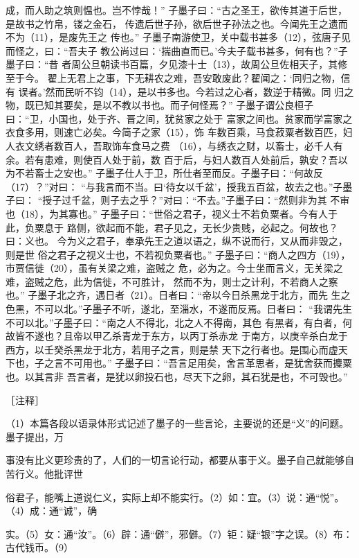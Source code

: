 \documentclass[12pt,UTF8]{ctexbook}
\begin{document}
成，而人助之筑则愠也。岂不悖哉！” 
子墨子曰：“古之圣王，欲传其道于后世，是故书之竹帛，镂之金石， 
传遗后世子孙，欲后世子孙法之也。今闻先王之遗而不为（11），是废先王之 
传也。” 
子墨子南游使卫，关中载书甚多（12），弦唐子见而怪之，曰：“吾夫子 
教公尚过曰：‘揣曲直而已。’今夫子载书甚多，何有也？”子墨子曰：“昔 
者周公旦朝读书百篇，夕见漆十士（13），故周公旦佐相天子，其修至于今。 
翟上无君上之事，下无耕农之难，吾安敢废此？翟闻之：‘同归之物，信有 
误者。’然而民听不钧（14），是以书多也。今若过之心者，数逆于精微。同 
归之物，既已知其要矣，是以不教以书也。而子何怪焉？” 
子墨子谓公良桓子曰：“卫，小国也，处于齐、晋之间，犹贫家之处于 
富家之间也。贫家而学富家之衣食多用，则速亡必矣。今简子之家（15），饰 
车数百乘，马食菽粟者数百匹，妇人衣文绣者数百人，吾取饰车食马之费 
（16），与绣衣之财，以畜士，必千人有余。若有患难，则使百人处于前，数 
百于后，与妇人数百人处前后，孰安？吾以为不若畜士之安也。” 
子墨子仕人于卫，所仕者至而反。子墨子曰：“何故反（17）？”对曰： 
“与我言而不当。曰‘待女以千盆’，授我五百盆，故去之也。”子墨子曰： 
“授子过千盆，则子去之乎？”对曰：“不去。”子墨子曰：“然则非为其 
不审也（18），为其寡也。” 
子墨子曰：“世俗之君子，视义士不若负粟者。今有人于此，负粟息于 
路侧，欲起而不能，君子见之，无长少贵贱，必起之。何故也？曰：义也。 
今为义之君子，奉承先王之道以语之，纵不说而行，又从而非毁之，则是世 
俗之君子之视义士也，不若视负粟者也。” 
子墨子曰：“商人之四方（19），市贾信徙（20），虽有关梁之难，盗贼之 
危，必为之。今士坐而言义，无关梁之难，盗贼之危，此为信徙，不可胜计， 
然而不为，则士之计利，不若商人之察也。” 
子墨子北之齐，遇日者（21）。日者曰：“帝以今日杀黑龙于北方，而先 
生之色黑，不可以北。”子墨子不听，遂北，至淄水，不遂而反焉。日者曰： 
“我谓先生不可以北。”子墨子曰：“南之人不得北，北之人不得南，其色 
有黑者，有白者，何故皆不遂也？且帝以甲乙杀青龙于东方，以丙丁杀赤龙 
于南方，以庚辛杀白龙于西方，以壬癸杀黑龙于北方，若用子之言，则是禁 
天下之行者也。是围心而虚天下也，子之言不可用也。” 
子墨子曰：“吾言足用矣，舍言革思者，是犹舍获而攗粟也。以其言非 
吾言者，是犹以卵投石也，尽天下之卵，其石犹是也，不可毁也。” 


［注释］ 

（1）本篇各段以语录体形式记述了墨子的一些言论，主要说的还是“义”的问题。墨子提出，万 

事没有比义更珍贵的了，人们的一切言论行动，都要从事于义。墨子自己就能够自苦行义。他批评世 

俗君子，能嘴上道说仁义，实际上却不能实行。（2）如：宜。（3）说：通“悦”。（4）成：通“诚”，确 

实。（5）女：通“汝”。（6）辟：通“僻”，邪僻。（7）钜：疑“银”字之误。（8）布：古代钱币。（9） 
\end{document}
